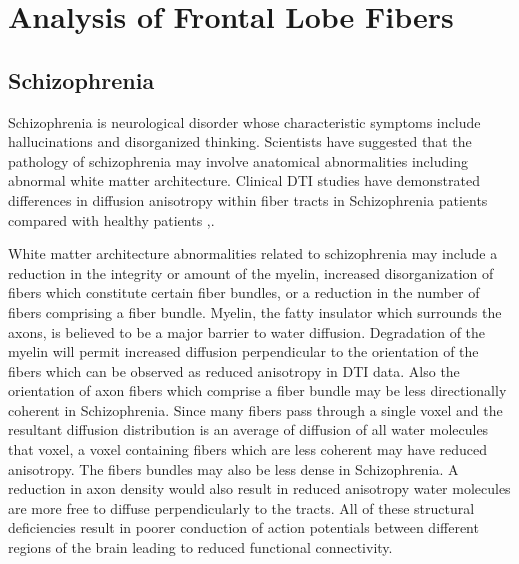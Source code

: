 \chapter{Analysis of Frontal Lobe Fibers}
\section{Schizophrenia}
Schizophrenia is neurological disorder whose characteristic symptoms include hallucinations and disorganized thinking.  Scientists have suggested that the pathology of schizophrenia may involve anatomical abnormalities including abnormal white matter architecture.  Clinical DTI studies have demonstrated differences in diffusion anisotropy within fiber tracts in Schizophrenia patients compared with healthy patients \cite{kubickiBiologPsych03},\cite{kubickiNI05}.

White matter architecture abnormalities related to schizophrenia may include a reduction in the integrity or amount of the myelin, increased disorganization of fibers which constitute certain fiber bundles, or a reduction in the number of fibers comprising a fiber bundle. Myelin, the fatty insulator which surrounds the axons, is believed to be a major barrier to water diffusion.  Degradation of the myelin will permit increased diffusion perpendicular to the orientation of the fibers which can be observed as reduced anisotropy in DTI data.  Also the orientation of axon fibers which comprise a fiber bundle may be less directionally coherent in Schizophrenia.  Since many fibers pass through a single voxel and the resultant diffusion distribution is an average of diffusion of all water molecules that voxel, a voxel containing fibers which are less coherent may have reduced anisotropy.  The fibers bundles may also be less dense in Schizophrenia.  A reduction in axon density would also result in reduced anisotropy water molecules are more free to diffuse perpendicularly to the tracts.  All of these structural deficiencies result in poorer conduction of action potentials between different regions of the brain leading to reduced functional connectivity.

